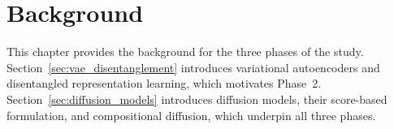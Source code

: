 
\chapter{Background}
\label{chap:background}

This chapter provides the background for the three phases of the study.
Section~\ref{sec:vae_disentanglement} introduces variational autoencoders and disentangled
representation learning, which motivates Phase~2. Section~\ref{sec:diffusion_models}
introduces diffusion models, their score-based formulation, and compositional diffusion,
which underpin all three phases.





% 
